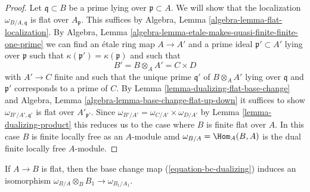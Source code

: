 \begin{proof}
Let $\mathfrak q \subset B$ be a prime lying over $\mathfrak p \subset A$.
We will show that the localization $\omega_{B/A, \mathfrak q}$ is flat
over $A_\mathfrak p$.
This suffices by Algebra, Lemma \ref{algebra-lemma-flat-localization}.
By
Algebra, Lemma \ref{algebra-lemma-etale-makes-quasi-finite-finite-one-prime}
we can find an \'etale ring map $A \to A'$ and a prime
ideal $\mathfrak p' \subset A'$ lying over $\mathfrak p$
such that $\kappa(\mathfrak p') = \kappa(\mathfrak p)$ and
such that
$$
B' = B \otimes_A A' = C \times D
$$
with $A' \to C$ finite and such that the unique prime $\mathfrak q'$
of $B \otimes_A A'$ lying over $\mathfrak q$ and $\mathfrak p'$
corresponds to a prime of $C$. By 
Lemma \ref{lemma-dualizing-flat-base-change}
and Algebra, Lemma \ref{algebra-lemma-base-change-flat-up-down}
it suffices to show $\omega_{B'/A', \mathfrak q'}$
is flat over $A'_{\mathfrak p'}$.
Since $\omega_{B'/A'} = \omega_{C/A'} \times \omega_{D/A'}$
by Lemma \ref{lemma-dualizing-product}
this reduces us to the case where $B$ is finite flat over $A$.
In this case $B$ is finite locally free as an $A$-module
amd $\omega_{B/A} = \Hom_A(B, A)$ is the dual finite
locally free $A$-module.
\end{proof}

\begin{lemma}
\label{lemma-dualizing-base-change-of-flat}
If $A \to B$ is flat, then the base change map (\ref{equation-bc-dualizing})
induces an isomorphism $\omega_{B/A} \otimes_B B_1 \to \omega_{B_1/A_1}$.
\end{lemma}

